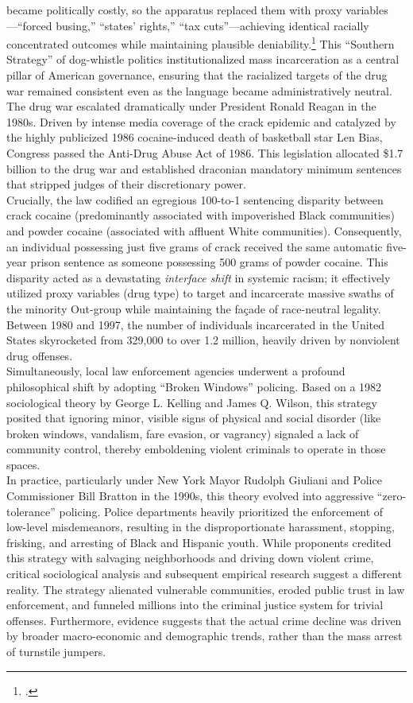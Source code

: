 \documentclass[
]{article}
\begin{document}
became politically costly, so the apparatus replaced them with proxy
variables---``forced busing,'' ``states' rights,'' ``tax
cuts''---achieving identical racially concentrated outcomes while
maintaining plausible deniability.\footcite{atwater_interview} This
``Southern Strategy'' of dog-whistle politics institutionalized mass
incarceration as a central pillar of American governance, ensuring that
the racialized targets of the drug war remained consistent even as the
language became administratively neutral.\\
The drug war escalated dramatically under President Ronald Reagan in the
1980s. Driven by intense media coverage of the crack epidemic and
catalyzed by the highly publicized 1986 cocaine-induced death of
basketball star Len Bias, Congress passed the Anti-Drug Abuse Act of
1986. This legislation allocated \$1.7 billion to the drug war and
established draconian mandatory minimum sentences that stripped judges
of their discretionary power.\\
Crucially, the law codified an egregious 100-to-1 sentencing disparity
between crack cocaine (predominantly associated with impoverished Black
communities) and powder cocaine (associated with affluent White
communities). Consequently, an individual possessing just five grams of
crack received the same automatic five-year prison sentence as someone
possessing 500 grams of powder cocaine. This disparity acted as a
devastating \emph{interface shift} in systemic racism; it effectively
utilized proxy variables (drug type) to target and incarcerate massive
swaths of the minority Out-group while maintaining the façade of
race-neutral legality. Between 1980 and 1997, the number of individuals
incarcerated in the United States skyrocketed from 329,000 to over 1.2
million, heavily driven by nonviolent drug offenses.\\
Simultaneously, local law enforcement agencies underwent a profound
philosophical shift by adopting ``Broken Windows'' policing. Based on a
1982 sociological theory by George L. Kelling and James Q. Wilson, this
strategy posited that ignoring minor, visible signs of physical and
social disorder (like broken windows, vandalism, fare evasion, or
vagrancy) signaled a lack of community control, thereby emboldening
violent criminals to operate in those spaces.\\
In practice, particularly under New York Mayor Rudolph Giuliani and
Police Commissioner Bill Bratton in the 1990s, this theory evolved into
aggressive ``zero-tolerance'' policing. Police departments heavily
prioritized the enforcement of low-level misdemeanors, resulting in the
disproportionate harassment, stopping, frisking, and arresting of Black
and Hispanic youth. While proponents credited this strategy with
salvaging neighborhoods and driving down violent crime, critical
sociological analysis and subsequent empirical research suggest a
different reality. The strategy alienated vulnerable communities, eroded
public trust in law enforcement, and funneled millions into the criminal
justice system for trivial offenses. Furthermore, evidence suggests that
the actual crime decline was driven by broader macro-economic and
demographic trends, rather than the mass arrest of turnstile jumpers.
\end{document}

